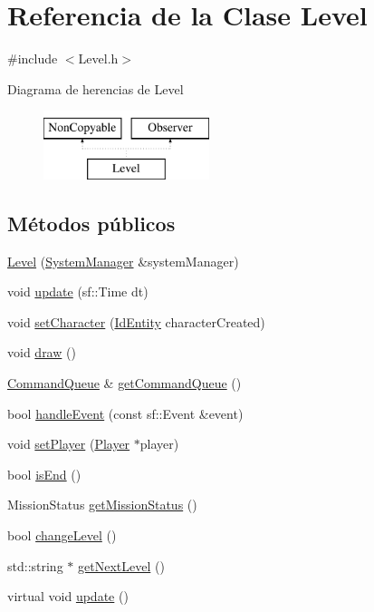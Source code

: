 \hypertarget{classLevel}{}\section{Referencia de la Clase Level}
\label{classLevel}


{\ttfamily \#include $<$Level.\+h$>$}

Diagrama de herencias de Level\begin{figure}[H]
\begin{center}
\leavevmode
\includegraphics[height=2.000000cm]{classLevel}
\end{center}
\end{figure}
\subsection*{Métodos públicos}
\begin{DoxyCompactItemize}
\item 
\hyperlink{classLevel_ab9c7695bbbc6015fe59e4f8887764d2b}{Level} (\hyperlink{classSystemManager}{System\+Manager} \&system\+Manager)
\item 
void \hyperlink{classLevel_a67f86520cebd83af4312dc7ed26fb694}{update} (sf\+::\+Time dt)
\item 
void \hyperlink{classLevel_a16b763dfb766969c8fefec9dd11207e9}{set\+Character} (\hyperlink{classIdEntity}{Id\+Entity} character\+Created)
\item 
void \hyperlink{classLevel_a9b7478818e1aa80d3d4d059fa5faf9bf}{draw} ()
\item 
\hyperlink{classCommandQueue}{Command\+Queue} \& \hyperlink{classLevel_a9ef5d17350297a086d87b0936fec5ecb}{get\+Command\+Queue} ()
\item 
bool \hyperlink{classLevel_a135b421112c9b9a14229a59b62a82041}{handle\+Event} (const sf\+::\+Event \&event)
\item 
void \hyperlink{classLevel_a961437d70dad81b0fddb3fb728ea67af}{set\+Player} (\hyperlink{classPlayer}{Player} $\ast$player)
\item 
bool \hyperlink{classLevel_a24b4e540cca52b4d73790ce7850e62db}{is\+End} ()
\item 
Mission\+Status \hyperlink{classLevel_a6098504924fa73e05dd7a4a945b61766}{get\+Mission\+Status} ()
\item 
bool \hyperlink{classLevel_a153be085b66dc212ab9ac507c0057240}{change\+Level} ()
\item 
std\+::string $\ast$ \hyperlink{classLevel_a3d7b2e75b73bf8b459bf9a547cd923b7}{get\+Next\+Level} ()
\item 
virtual void \hyperlink{classLevel_a62e412eaad753d2baa2f94239cb80e41}{update} ()
\end{DoxyCompactItemize}


